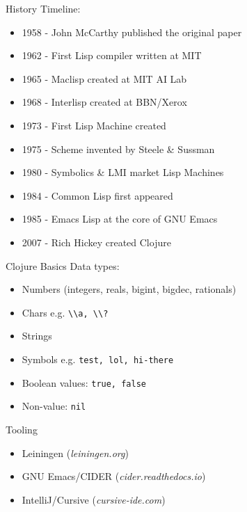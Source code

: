 \documentclass[pdf]{beamer}
\begin{document}
\begin{frame}{History}
  Timeline:
  \pause
  \begin{itemize}
  \item 1958 - John McCarthy published the original paper
    \pause
  \item 1962 - First Lisp compiler written at MIT
    \pause
  \item 1965 - Maclisp created at MIT AI Lab
    \pause
  \item 1968 - Interlisp created at BBN/Xerox
    \pause
  \item 1973 - First Lisp Machine created
    \pause
  \item 1975 - Scheme invented by Steele \& Sussman
    \pause
  \item 1980 - Symbolics \& LMI market Lisp Machines
    \pause
  \item 1984 - Common Lisp first appeared
    \pause
  \item 1985 - Emacs Lisp at the core of GNU Emacs
    \pause
  \item 2007 - Rich Hickey created Clojure
  \end{itemize}
\end{frame}

\begin{frame}{Clojure Basics}
  Data types:
  \pause
  \begin{itemize}
  \item Numbers (integers, reals, bigint, bigdec, rationals)
    \pause
  \item Chars e.g. \lstinline{\\a, \\?}
    \pause
  \item Strings
    \pause
  \item Symbols e.g. \lstinline{test, lol, hi-there}
    \pause
  \item Boolean values: \lstinline{true, false}
    \pause
  \item Non-value: \lstinline{nil}
  \end{itemize}
\end{frame}

\begin{frame}{Tooling}
  \begin{itemize}
    \pause
  \item Leiningen (\textit{leiningen.org})
    \pause
  \item GNU Emacs/CIDER (\textit{cider.readthedocs.io})
    \pause
  \item IntelliJ/Cursive (\textit{cursive-ide.com})
  \end{itemize}
\end{frame}
\end{document}
